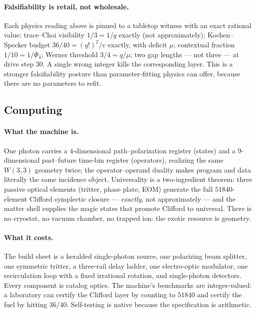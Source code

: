 \documentclass[11pt]{article}
\newcommand{\W}{W(3,3)}
\begin{document}
\paragraph{Falsifiability is retail, not wholesale.}  Each physics
reading above is pinned to a tabletop witness with an exact rational
value: trace--Choi visibility $1/3=1/q$ exactly (not approximately);
Kochen--Specker budget $36/40=(q!)^2/v$ exactly, with deficit $\mu$;
contextual fraction $1/10=1/\Phi_4$; Werner threshold $3/4=q/\mu$;
two gap lengths --- not three --- at drive step $30$.  A single wrong
integer kills the corresponding layer.  This is a stronger
falsifiability posture than parameter-fitting physics can offer,
because there are no parameters to refit.

\subsection{Computing}

\paragraph{What the machine is.}  One photon carries a $4$-dimensional
path--polarization register (states) and a $9$-dimensional
past--future time-bin register (operators), realizing the same
$\W$ geometry twice; the operator--operand duality makes program and
data literally the same incidence object.  Universality is a
two-ingredient theorem: three passive optical elements (tritter,
phase plate, EOM) generate the full $51840$-element Clifford
symplectic closure --- \emph{exactly}, not approximately --- and the
matter shell supplies the magic states that promote Clifford to
universal.  There is no cryostat, no vacuum chamber, no trapped ion:
the exotic resource is geometry.

\paragraph{What it costs.}  The build sheet is a heralded
single-photon source, one polarizing beam splitter, one symmetric
tritter, a three-rail delay ladder, one electro-optic modulator, one
recirculation loop with a fixed irrational rotation, and
single-photon detectors.  Every component is catalog optics.  The
machine's benchmarks are integer-valued: a laboratory can certify the
Clifford layer by counting to $51840$ and certify the fuel by hitting
$36/40$.  Self-testing is native because the specification is
arithmetic.
\end{document}
